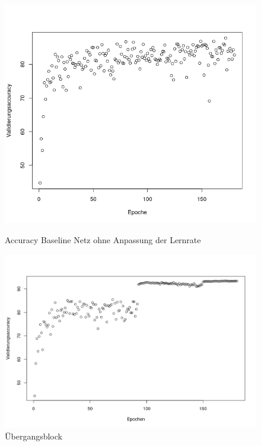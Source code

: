 \begin{figure}[h]
   \begin{minipage}[c]{.45\linewidth} %
      \includegraphics[width=1\linewidth]{KapitelPartB/Images/BaseAcc1.png}
      \caption{Accuracy Baseline Netz ohne Anpassung der Lernrate}
      \label{abb:baseAcc1}
      \end{minipage}
   \begin{minipage}[c]{.45\linewidth} %
      \includegraphics[width=1\linewidth]{KapitelPartB/Images/BaseAcc2.png}
      \caption{Übergangsblock}
      \label{abb:baseAcc2}
   \end{minipage}
   \label{abb:blocks}
\end{figure}

